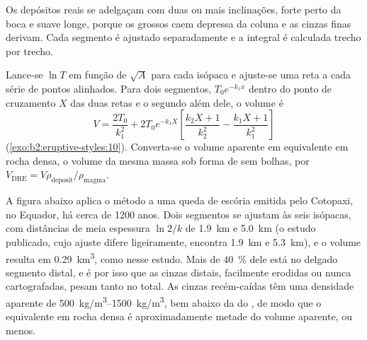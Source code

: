 Os depósitos reais se adelgaçam com duas ou mais inclinações, forte perto da boca e suave
longe, porque os  grossos caem depressa da coluna e as cinzas finas
derivam. Cada segmento é ajustado separadamente e a integral é calculada trecho por
trecho.

\begin{method}\label{met:b2:eruptive-styles:volume}
Lance-se $\ln T$ em função de $\sqrt A$ para cada isópaca e ajuste-se uma reta a cada
série de pontos alinhados. Para dois segmentos, $T_0e^{-k_1x}$ dentro do ponto de cruzamento
$X$ das duas retas e o segundo além dele, o volume é
\[
V = \frac{2T_0}{k_1^2} + 2T_0e^{-k_1X}\left[\frac{k_2X + 1}{k_2^2} -
\frac{k_1X + 1}{k_1^2}\right]
\]
(\cref{exo:b2:eruptive-styles:10}). Converta-se o volume aparente em equivalente em rocha densa, o volume da
mesma massa sob forma de  sem bolhas, por $V_{\mathrm{DRE}} = V\rho_{\mathrm{deposit}}/\rho_{\mathrm{magma}}$.
\end{method}

A figura abaixo aplica o método a uma queda de escória emitida pelo Cotopaxi, no
Equador, há cerca de \num{1200} anos. Dois segmentos se ajustam às seis isópacas, com
distâncias de meia espessura $\ln 2/k$ de \qty{1.9}{km} e \qty{5.0}{km} (o
estudo publicado, cujo ajuste difere ligeiramente, encontra \qty{1.9}{km} e
\qty{5.3}{km}), e o volume resulta em \qty{0.29}{km^3}, como nesse estudo. Mais de
\qty{40}{\percent} dele está no delgado segmento distal, e é por isso que as cinzas distais,
facilmente erodidas ou nunca cartografadas, pesam tanto no total. As cinzas recém-caídas
têm uma densidade aparente de \qtyrange{500}{1500}{kg/m^3}, bem abaixo da do
, de modo que o equivalente em rocha densa é aproximadamente metade do volume aparente, ou menos.

